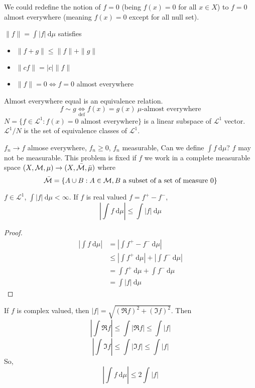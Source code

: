We could redefine the notion of $f=0$ (being $f(x) = 0$ for all $x \in X$) to $f = 0$ almost everywhere (meaning $f(x) = 0$ except for all null set).


\begin{remark}
  $\|f\| = \int |f|\ \mathrm{d}\mu$ satisfies
  \begin{itemize}
    \item $\|f + g\| \le \|f\| + \|g\|$
    \item $\|c f\| = |c|\|f\|$
    \item $\|f\| = 0 \iff f = 0$ almost everywhere
  \end{itemize}
\end{remark}

\begin{remark}
  Almost everywhere equal is an equivalence relation.
  \[f \sim g \underset{\text{def}}\iff f(x) = g(x)\ \mu\text{-almost everywhere}\]
  $N = \{f \in\mathcal{L}^1 : f(x) = 0 \text{ almost everywhere}\}$ is a linear subspace of $\mathcal{L}^1$ vector.
  $\mathcal{L}^1/N$ is the set of equivalence classes of $\mathcal{L}^1$.
\end{remark}

$f_n \to f$ almose everywhere, $f_n \ge 0$, $f_n$ measurable, Can we define $\int f\ \mathrm{d}\mu$?
$f$ may not be measurable. This problem is fixed if $f$ we work in a complete measurable space
$(X, \mathcal M, \mu) \to (X, \bar{\mathcal M}, \bar{\mu})$
where 
\[\bar{\mathcal M} = \{A \cup B : A \in \mathcal M, B \text{ a subset of a set of measure }0\}\]

\begin{lemma}
$f \in \mathcal{L}^1$, $\int |f|\ \mathrm{d}\mu < \infty$. If $f$ is real valued $f = f^+ - f^-$,
\[\left|\int f\ \mathrm{d}\mu \right| \le \int |f| \ \mathrm{d}\mu\]
\end{lemma}
\begin{proof}
  \begin{align*}
    \left|\int f\ \mathrm{d}\mu \right| &= \left|\int f^+ - f^- \ \mathrm{d}\mu \right| \\
    &\le \left|\int f^+ \ \mathrm{d}\mu \right| + \left|\int f^- \ \mathrm{d}\mu \right| \\
    &= \int f^+ \ \mathrm{d}\mu + \int f^- \ \mathrm{d}\mu \\
    &= \int |f| \ \mathrm{d}\mu
  \end{align*}
\end{proof}

\begin{remark}
  If $f$ is complex valued, then $|f| = \sqrt{(\Re f)^2 + (\Im f)^2}$.
  Then
  \[\left|\int \Re f \right|\le \int |\Re f| \le \int |f|\]
  \[\left|\int \Im f \right|\le \int |\Im f| \le \int |f|\]
  So, 
  \[\left|\int f\ \mathrm{d}\mu \right| \le 2\int |f|\]
\end{remark}

